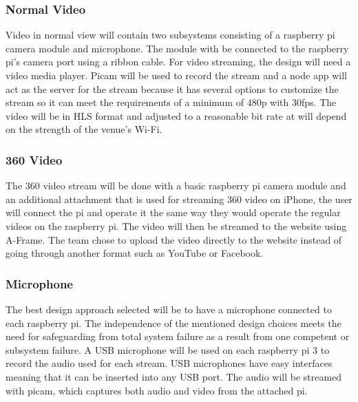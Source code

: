 \documentclass[onecolumn, draftclsnofoot,10pt, compsoc]{IEEEtran}
\begin{document}
        \subsubsection{Normal Video}
        Video in normal view will contain two subsystems consisting of a raspberry pi camera module and microphone. 
        The module with be connected to the raspberry pi's camera port using a ribbon cable. 
        For video streaming, the design will need a video media player. 
        Picam will be used to record the stream and a node app will act as the server for the stream because it has several options to customize the stream so it can meet the requirements of a minimum of 480p with 30fps. 
        The video will be in HLS format and adjusted to a reasonable bit rate at will depend on the strength of the venue's Wi-Fi. 
        
        \subsubsection{360 Video}
        The 360 video stream will be done with a basic raspberry pi camera module and an additional attachment that is used for streaming 360 video on iPhone, the user will connect the pi and operate it the same way they would operate the regular videos on the raspberry pi.
        The video will then be streamed to the website using A-Frame.
        The team chose to upload the video directly to the website instead of going through another format such as YouTube or Facebook.
        
        \subsubsection{Microphone}
        The best design approach selected will be to have a microphone connected to each raspberry pi.  
        The independence of the mentioned design choices meets the need for safeguarding from total system failure as a result from one competent or subsystem failure.
        A USB microphone will be used on each raspberry pi 3 to record the audio used for each stream. 
        USB microphones have easy interfaces meaning that it can be inserted into any USB port. 
        The audio will be streamed with picam, which captures both audio and video from the attached pi. 

        
\end{document}
